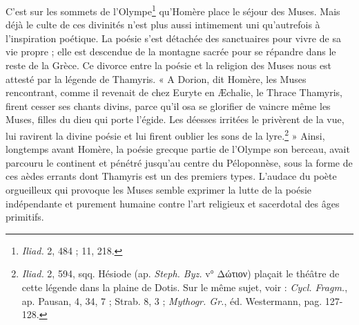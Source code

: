 \documentclass[a4paper, 11pt, oneside, polutonikogreek, french]{article}
\begin{document}
C'est sur les sommets de l'Olympe\footnote{\emph{Iliad.} 2, 484 ; 11, 218.} qu'Homère place le séjour des Muses. Mais déjà le culte de ces divinités n'est plus aussi intimement uni qu'autrefois à l'inspiration poétique. La poésie s'est détachée des sanctuaires pour vivre de sa vie propre ; elle est descendue de la montagne sacrée pour se répandre dans le reste de la Grèce. Ce divorce entre la poésie et la religion des Muses nous est attesté par la légende de Thamyris. « A Dorion, dit Homère, les Muses rencontrant, comme il revenait de chez Euryte en Æchalie, le Thrace Thamyris, firent cesser ses chants divins, parce qu'il osa se glorifier de vaincre même les Muses, filles du dieu qui porte l'égide. Les déesses irritées le privèrent de la vue, lui ravirent la divine poésie et lui firent oublier les sons de la lyre.\footnote{\emph{Iliad.} 2, 594, sqq. Hésiode (ap. \emph{Steph. Byz.} v° Δώτιον) plaçait le théâtre de cette légende dans la plaine de Dotis. Sur le même sujet, voir : \emph{Cycl. Fragm.}, ap. Pausan, 4, 34, 7 ; Strab. 8, 3 ; \emph{Mythogr. Gr.}, éd. Westermann, pag. 127-128.} » Ainsi, longtemps avant Homère, la poésie grecque partie de l'Olympe son berceau, avait parcouru le continent et pénétré jusqu'au centre du Péloponnèse, sous la forme de ces aèdes errants dont Thamyris est un des premiers types. L'audace du poète orgueilleux qui provoque les Muses semble exprimer la lutte de la poésie indépendante et purement humaine contre l'art religieux et sacerdotal des âges primitifs.
\end{document}
